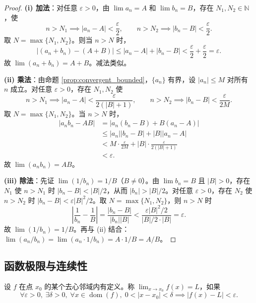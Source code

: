 \begin{proof}
\textbf{(i) 加法}：对任意 $\varepsilon > 0$，由 $\lim a_n = A$ 和 $\lim b_n = B$，存在 $N_1, N_2 \in \mathbb{N}$，使
\[
n > N_1 \implies |a_n - A| < \frac{\varepsilon}{2}, \qquad n > N_2 \implies |b_n - B| < \frac{\varepsilon}{2}.
\]
取 $N = \max\{N_1, N_2\}$。则当 $n > N$ 时，
\[
|(a_n + b_n) - (A + B)| \le |a_n - A| + |b_n - B| < \frac{\varepsilon}{2} + \frac{\varepsilon}{2} = \varepsilon.
\]
故 $\lim(a_n + b_n) = A + B$。减法类似。

\textbf{(ii) 乘法}：由命题 \ref{prop:convergent_bounded}，$\{a_n\}$ 有界，设 $|a_n| \le M$ 对所有 $n$ 成立。对任意 $\varepsilon > 0$，存在 $N_1, N_2$ 使
\[
n > N_1 \implies |a_n - A| < \frac{\varepsilon}{2(|B| + 1)}, \qquad n > N_2 \implies |b_n - B| < \frac{\varepsilon}{2M}.
\]
取 $N = \max\{N_1, N_2\}$。当 $n > N$ 时，
\begin{align*}
|a_n b_n - AB|
&= |a_n(b_n - B) + B(a_n - A)| \\
&\le |a_n||b_n - B| + |B||a_n - A| \\
&< M \cdot \frac{\varepsilon}{2M} + |B| \cdot \frac{\varepsilon}{2(|B|+1)} \\
&< \varepsilon.
\end{align*}
故 $\lim(a_n b_n) = AB$。

\textbf{(iii) 除法}：先证 $\lim(1/b_n) = 1/B$（$B \neq 0$）。由 $\lim b_n = B$ 且 $|B| > 0$，存在 $N_1$ 使 $n > N_1$ 时 $|b_n - B| < |B|/2$，从而 $|b_n| > |B|/2$。对任意 $\varepsilon > 0$，存在 $N_2$ 使 $n > N_2$ 时 $|b_n - B| < \varepsilon |B|^2/2$。取 $N = \max\{N_1, N_2\}$，则 $n > N$ 时
\[
\left|\frac{1}{b_n} - \frac{1}{B}\right| = \frac{|b_n - B|}{|b_n||B|} < \frac{\varepsilon |B|^2/2}{|B|/2 \cdot |B|} = \varepsilon.
\]
故 $\lim(1/b_n) = 1/B$。再与 (ii) 结合：$\lim(a_n/b_n) = \lim(a_n \cdot 1/b_n) = A \cdot 1/B = A/B$。
\end{proof}

\subsection{\texorpdfstring{函数极限与连续性}{函数极限与连续性}}

\begin{definition}[函数极限]\label{def:func_limit}
设 $f$ 在点 $x_0$ 的某个去心邻域内有定义。称 $\displaystyle\lim_{x\to x_0} f(x) = L$，如果
\[\forall \varepsilon > 0,\; \exists \delta > 0,\; \forall x \in \operatorname{dom}(f),\; 0 < |x - x_0| < \delta \implies |f(x) - L| < \varepsilon.\]
\end{definition}

